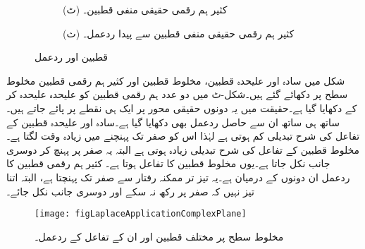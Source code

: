 \begin{figure}
\begin{subfigure}{0.5\textwidth}
\end{subfigure}
\begin{subfigure}{0.5\textwidth}
\centering
{}
\caption*{(ٹ) کثیر ہم رقمی حقیقی منفی قطبین۔}
\end{subfigure}%
\begin{subfigure}{0.5\textwidth}
\centering
{}
\caption*{(ث) کثیر ہم رقمی حقیقی منفی قطبین سے پیدا ردعمل۔}
\end{subfigure}
\caption{قطبین اور ردعمل}
\label{شکل_لاپلاس_استعمال_قطبین_اور_ردعمل}
\end{figure}

شکل  میں سادہ اور علیحدہ قطبین، مخلوط قطبین اور کثیر  ہم رقمی قطبین مخلوط سطح پر دکھائے گئے ہیں۔شکل-ٹ میں دو عدد ہم رقمی قطبین کو علیحدہ علیحدہ کر کے دکھایا گیا ہے۔حقیقت میں یہ دونوں حقیقی محور پر ایک ہی نقطے پر پائے جاتے ہیں۔ساتھ ہی ساتھ ان سے حاصل ردعمل بھی دکھایا گیا ہے۔سادہ اور علیحدہ قطبین کے تفاعل  کی شرح تبدیلی کم ہوتی ہے لہٰذا اس کو صفر تک پہنچنے میں زیادہ وقت لگتا ہے۔ مخلوط قطبین کے تفاعل کی شرح تبدیلی زیادہ ہوتی ہے البتہ یہ صفر پر پہنچ کر دوسری جانب نکل جاتا ہے۔یوں مخلوط قطبین کا تفاعل  ہوتا ہے۔ کثیر ہم رقمی قطبین کا ردعمل ان دونوں کے درمیان ہے۔یہ تیز تر ممکنہ رفتار سے صفر تک پہنچتا ہے، البتہ اتنا تیز نہیں کہ صفر پر رکھ نہ سکے اور دوسری جانب نکل جائے۔

\begin{figure}
\centering
\texttt{[image: figLaplaceApplicationComplexPlane]}
\caption{مخلوط سطح پر مختلف قطبین اور ان کے تفاعل کے ردعمل۔}
\label{شکل_لاپلاس_استعمال_مختلف_قطبین}
\end{figure}

